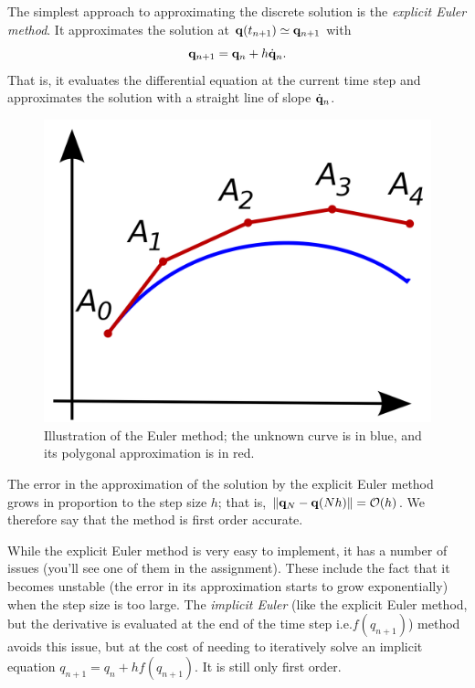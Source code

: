 The simplest approach to approximating the discrete solution is the \emph{explicit Euler method}. It approximates the solution at ${\bf q}(t_{n+1})\simeq {\bf q}_{n+1}$ with
$$
	{\bf q}_{n+1} = {\bf q}_n + h \dot{\bf q}_n.
$$
That is, it evaluates the differential equation at the current time step and approximates the solution with a straight line of slope $\dot{\bf q}_n$. 

\begin{figure}[H]
	\centering
	\includegraphics[scale=0.075]{expliciteuler.png}
	\caption{Illustration of the Euler method; the unknown curve is in blue, and its polygonal approximation is in red.}
\end{figure}

The error in the approximation of the solution by the explicit Euler method grows in proportion to the step size $h$; that is, $\|{\bf q}_N-{\bf q}(Nh)\|=\mathcal{O}(h)$. We therefore say that the method is first order accurate.

While the explicit Euler method is very easy to implement, it has a number of issues (you'll see one of them in the assignment). These include the fact that it becomes unstable (the error in its approximation starts to grow exponentially) when the step size is too large. The \emph{implicit Euler} (like the explicit Euler method, but the derivative is evaluated at the end of the time step i.e.$f(q_{n+1})$) method avoids this issue, but at the cost of needing to iteratively solve an implicit equation $q_{n+1}=q_n+hf(q_{n+1})$. It is still only first order.

